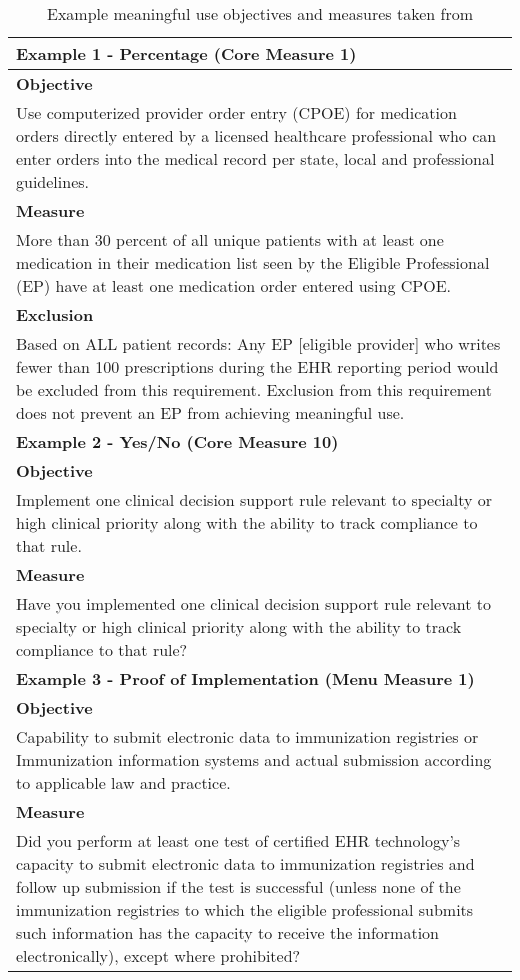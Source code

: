 \begin{table}
	\begin{tabular}{ |p{17.5cm}| }
		\hline
		\textbf{Example 1 - Percentage (Core Measure 1)} \\
		\hline
		\textbf{Objective} \\
		Use computerized provider order entry (CPOE) for medication orders directly entered by a licensed healthcare professional who can enter orders into the medical record per state, local and professional guidelines. \\
		\textbf{Measure} \\
		More than 30 percent of all unique patients with at least one medication in their medication list seen by the Eligible Professional (EP) have at least one medication order entered using CPOE. \\
		\textbf{Exclusion} \\
		Based on ALL patient records: Any EP [eligible provider] who writes fewer than 100 prescriptions during the EHR reporting period would be excluded from this requirement. Exclusion from  this requirement does not prevent an EP from achieving meaningful use. \\
		\hline
		\textbf{Example 2 - Yes/No (Core Measure 10)} \\
		\hline
		\textbf{Objective} \\
		Implement one clinical decision support rule relevant to specialty or high clinical priority along with the ability to track compliance to that rule. \\
		\textbf{Measure} \\
		Have you implemented one clinical decision support rule relevant to specialty or high clinical priority along with the ability to track compliance to that rule? \\
		\hline
		\textbf{Example 3 - Proof of Implementation (Menu Measure 1)} \\
		\hline
		\textbf{Objective} \\
		Capability to submit electronic data to immunization registries or Immunization information systems and actual submission according to applicable law and practice. \\
		\textbf{Measure} \\
		Did you perform at least one test of certified EHR technology’s capacity to submit electronic data to immunization registries and follow up submission if the test is successful (unless none of the immunization registries to which the eligible professional submits such information has the capacity to receive the information electronically), except where prohibited? \\
		\hline
		\end{tabular}
		\caption[Table caption text]{Example meaningful use objectives and measures taken from \cite{mu1-calc}}
		\label{table:mu_metrics_example}
\end{table}
